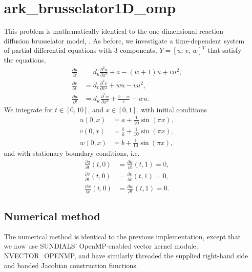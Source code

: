 \documentclass[letterpaper,10pt,english]{sphinxmanual}
\begin{document}
\section{ark\_brusselator1D\_omp}
\label{\detokenize{c_openmp:ark-brusselator1d-omp}}\label{\detokenize{c_openmp:id1}}
This problem is mathematically identical to the one-dimensional
reaction-diffusion brusselator model, {\hyperref[\detokenize{c_serial:ark-brusselator1d}]{}}.  As
before, we investigate a time-dependent system of partial differential
equations with 3 components, \(Y = [u,\, v,\, w]^T\) that satisfy
the equations,
\begin{equation*}
\begin{split}\frac{\partial u}{\partial t} &= d_u \frac{\partial^2 u}{\partial
   x^2} + a - (w+1) u + v u^2, \\
\frac{\partial v}{\partial t} &= d_v \frac{\partial^2 v}{\partial
   x^2} + w u - v u^2, \\
\frac{\partial w}{\partial t} &= d_w \frac{\partial^2 w}{\partial
   x^2} + \frac{b-w}{\varepsilon} - w u.\end{split}
\end{equation*}
We integrate for \(t \in [0, 10]\), and \(x \in [0, 1]\), with
initial conditions
\begin{equation*}
\begin{split}u(0,x) &=  a + \frac{1}{10} \sin(\pi x),\\
v(0,x) &= \frac{b}{a} + \frac{1}{10}\sin(\pi x),\\
w(0,x) &=  b + \frac{1}{10}\sin(\pi x),\end{split}
\end{equation*}
and with stationary boundary conditions, i.e.
\begin{equation*}
\begin{split}\frac{\partial u}{\partial t}(t,0) &= \frac{\partial u}{\partial t}(t,1) = 0,\\
\frac{\partial v}{\partial t}(t,0) &= \frac{\partial v}{\partial t}(t,1) = 0,\\
\frac{\partial w}{\partial t}(t,0) &= \frac{\partial w}{\partial t}(t,1) = 0.\end{split}
\end{equation*}

\subsection{Numerical method}
\label{\detokenize{c_openmp:numerical-method}}
The numerical method is identical to the previous implementation,
except that we now use SUNDIALS’ OpenMP-enabled vector kernel module,
NVECTOR\_OPENMP, and have similarly threaded the supplied right-hand
side and banded Jacobian construction functions.
\end{document}
